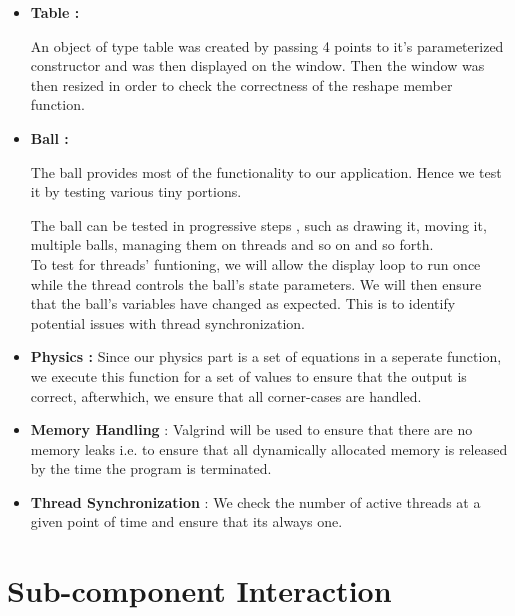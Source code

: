 \documentclass[]{article}
\begin{document}
\begin{itemize}



\item \textbf{Table :}

An object of type table was created by passing 4 points to it's parameterized constructor and was then displayed on the window. Then the window was then resized in order to check the correctness of the reshape member function.

\item \textbf{Ball :}

The ball provides most of the functionality to our application. Hence we test it by testing various tiny portions.

The ball can be tested in progressive steps , such as drawing it, moving it, multiple balls, managing them on threads and so on and so forth. \\

To test for threads' funtioning, we will allow the display loop to run once while the thread controls the ball's state parameters. We will then ensure that the ball's variables have changed as expected. This is to identify potential issues with thread synchronization.

\item \textbf{Physics :} Since our physics part is a set of equations in a seperate function, we execute this function for a set of values to ensure that the output is correct, afterwhich, we ensure that all corner-cases are handled.



\item \textbf{Memory Handling} : Valgrind will be used to ensure that there are no memory leaks i.e. to ensure that all dynamically allocated memory is released by the time the program is terminated.

\item \textbf{Thread Synchronization} : We check the number of active threads at a given point of time and ensure that its always one.


\end{itemize}

\section{Sub-component Interaction}
\end{document}
